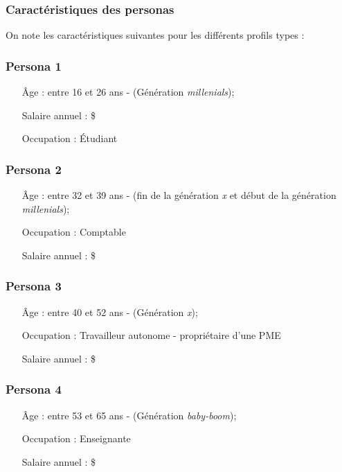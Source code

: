 \documentclass[11pt,french]{article}\usepackage[]{graphicx}\usepackage[]{color}
\begin{document}
\subsubsection{Caractéristiques des personas}
On note les caractéristiques suivantes pour les différents profils types :

\subsubsection*{Persona 1}
\label{per1}
\begin{itemize}
\item[Âge :] entre 16 et 26 ans - (Génération \emph{millenials});
\item[Salaire annuel :]  \$
\item[Occupation :] Étudiant
\end{itemize}

\subsubsection*{Persona 2}
\label{per2}
\begin{itemize}
\item[Âge :] entre 32 et 39 ans - (fin de la génération \emph{x} et début de la génération \emph{millenials});
\item[Occupation :] Comptable
\item[Salaire annuel :]  \$
\end{itemize}

\subsubsection*{Persona 3}
\label{per3}
\begin{itemize}
\item[Âge :] entre 40 et 52 ans - (Génération \emph{x});
\item[Occupation :] Travailleur autonome - propriétaire d'une PME
\item[Salaire annuel :]  \$
\end{itemize}

\subsubsection*{Persona 4}
\label{per4}
\begin{itemize}
\item[Âge :] entre 53 et 65 ans - (Génération \emph{baby-boom});
\item[Occupation :] Enseignante
\item[Salaire annuel :]  \$
\end{itemize}
\end{document}
